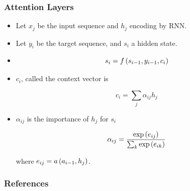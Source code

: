 \documentclass{beamer}
\begin{document}
\frame
{
   \frametitle{Attention Layers}

   \begin{itemize}
      \item<1-> Let $x_j$ be the input sequence and $h_j$ encoding by RNN.

      \item<2-> Let $y_i$ be the target sequence, and $s_i$ a hidden state.

      \item<3-> $$s_i = f \left({s_{i-1}, y_{i-1}, c_i}\right)$$

      \item<4-> $c_i$, called the context vector is

      $$c_i = \sum_j \alpha_{ij} h_j$$

      \item<5-> $\alpha_{ij}$ is the importance of $h_j$ for $s_i$

      $$\alpha_{ij} = \frac{\exp \left({e_{ij}}\right)} {\sum_k \exp \left({e_{ik}}\right)}$$

      where $e_{ij} = a \left({a_{i-1}, h_j}\right)$.

      
   \end{itemize}
}

\begin{frame}[t,allowframebreaks]
   \frametitle{References}
   \printbibliography
\end{frame}
\end{document}
